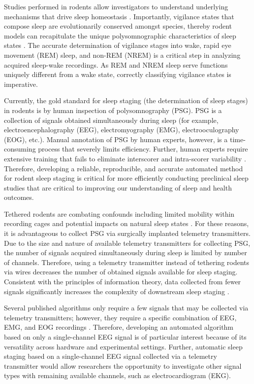 \documentclass[pdflatex,sn-mathphys-num]{sn-jnl}%
\theoremstyle{thmstyleone}%
\theoremstyle{thmstyletwo}%
\theoremstyle{thmstylethree}%
\begin{document}
Studies performed in rodents allow investigators to understand underlying mechanisms that drive sleep homeostasis \cite{rayan_sleep_2024}. Importantly, vigilance states that compose sleep are evolutionarily conserved amongst species, thereby rodent models can recapitulate the unique polysomnographic characteristics of sleep states \cite{rattenborg_evolution_2023}. The accurate determination of vigilance stages into wake, rapid eye movement (REM) sleep, and non-REM (NREM) is a critical step in analyzing acquired sleep-wake recordings. As REM and NREM sleep serve functions uniquely different from a wake state, correctly classifying vigilance states is imperative.

Currently, the gold standard for sleep staging (the determination of sleep stages) in rodents is by human inspection of polysomnography (PSG). PSG is a collection of signals obtained simultaneously during sleep (for example, electroencephalography (EEG), electromyography (EMG), electrooculography (EOG), etc.). Manual annotation of PSG by human experts, however, is a time-consuming process that severely limits efficiency. Further, human experts require extensive training that fails to eliminate interscorer and intra-scorer variability \cite{miladinovic_spindle_2019}. Therefore, developing a reliable, reproducible, and accurate automated method for rodent sleep staging is critical for more efficiently conducting preclinical sleep studies that are critical to improving our understanding of sleep and health outcomes.

Tethered rodents are combating confounds including limited mobility within recording cages and potential impacts on natural sleep states \cite{kramer_evaluation_2003,papazoglou_non-restraining_2016,rentschler_prenatal_2021}. For these reasons, it is advantageous to collect PSG via surgically implanted telemetry transmitters. Due to the size and nature of available telemetry transmitters for collecting PSG, the number of signals acquired simultaneously during sleep is limited by number of channels. Therefore, using a telemetry transmitter instead of tethering rodents via wires decreases the number of obtained signals available for sleep staging. Consistent with the principles of information theory, data collected from fewer signals significantly increases the complexity of downstream sleep staging \cite{shannon_mathematical_1948}.

Several published algorithms only require a few signals that may be collected via telemetry transmitters; however, they require a specific combination of EEG, EMG, and EOG recordings \cite{jha_slumbernet_2024,vallat_open-source_2021}. Therefore, developing an automated algorithm based on only a single-channel EEG signal is of particular interest because of its versatility across hardware and experimental settings. Further, automatic sleep staging based on a single-channel EEG signal collected via a telemetry transmitter would allow researchers the opportunity to investigate other signal types with remaining available channels, such as electrocardiogram (EKG).
\end{document}
